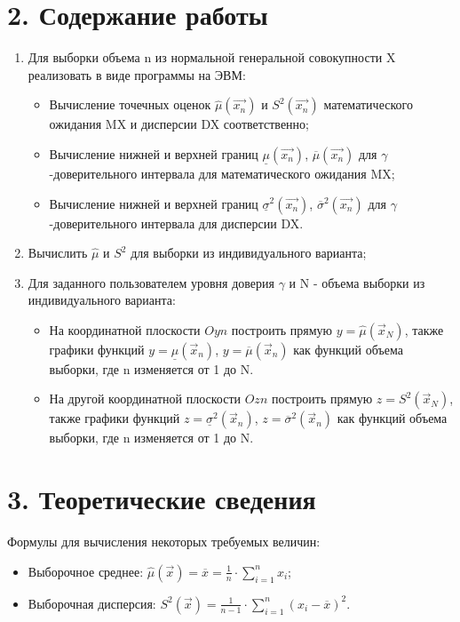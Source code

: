 \documentclass[12pt]{report}
\begin{document}
\section*{2. Содержание работы}

\begin{enumerate}
	\item Для выборки объема n из нормальной генеральной совокупности X реализовать в виде программы на ЭВМ:
	\begin{itemize}
		\item Вычисление точечных оценок $\hat\mu(\vec{x_n})$ и $S^2(\vec{x_n}) $ математического ожидания MX и дисперсии DX соответственно;
		\item Вычисление нижней и верхней границ $\underline{\mu}(\vec{x_n})$, $\overline{\mu}(\vec{x_n})$ для $\gamma$-доверительного интервала для математического ожидания MX;
		\item Вычисление нижней и верхней границ $\underline{\sigma}^2(\vec{x_n})$, $\overline{\sigma}^2(\vec{x_n})$ для $\gamma$-доверительного интервала для дисперсии DX.
	\end{itemize}
	\item Вычислить $\hat\mu$ и $S^2$ для выборки из индивидуального варианта;
	\item Для заданного пользователем уровня доверия $\gamma$ и N - объема выборки из индивидуального варианта:
	\begin{itemize}
		\item На координатной плоскости $Oyn$ построить прямую $y = \hat\mu(\vec{x}_N)$, также графики функций $y = \underline{\mu}(\vec{x}_n)$, $y = \overline{\mu}(\vec{x}_n)$ как функций объема выборки, где n изменяется от 1 до N.
		\item На другой координатной плоскости $Ozn$ построить прямую $z = S^2(\vec{x}_N)$, также графики функций $z = \underline{\sigma}^2(\vec{x}_n)$, $z = \overline{\sigma}^2(\vec{x}_n)$ как функций объема выборки, где n изменяется от 1 до N.
	\end{itemize}
\end{enumerate}

\section*{3. Теоретические сведения}

Формулы для вычисления некоторых требуемых величин:

\begin{itemize}
	\item Выборочное среднее: $\hat\mu(\vec{x}) = \overline x = \frac{1}{n} \cdot \sum\limits_{i=1}^{n} x_i$;
	\item Выборочная дисперсия: $S^2(\vec{x}) = \frac{1}{n-1} \cdot \sum\limits_{i=1}^{n} (x_i - \overline x)^2$.
\end{itemize}
\end{document}
